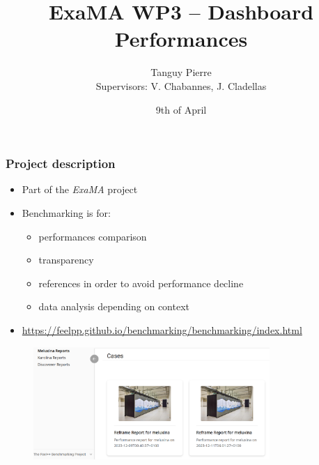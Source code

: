 \documentclass[10pt]{beamer}
\title{\textbf{ExaMA WP3 -- Dashboard Performances}}
\author[Tanguy PIERRE]{Tanguy Pierre\\[1cm] \small{Supervisors: V. Chabannes, J. Cladellas}}
\institute{University of Strasbourg}
\date{9th of April}
\begin{document}
\frame{\titlepage}


\begin{frame}
    \frametitle{\textbf{Project description}}

    \begin{itemize}
        \addtolength{\itemsep}{10pt}
        \item Part of the \textit{ExaMA} project
        \item Benchmarking is for:
        \begin{itemize}
            \item performances comparison
            \item transparency
            \item references in order to avoid performance decline
            \item data analysis depending on context
        \end{itemize}
        \item {\footnotesize\url{https://feelpp.github.io/benchmarking/benchmarking/index.html}}
    \end{itemize}
    \begin{figure}
        \centering
        \includegraphics[width=0.8\textwidth]{../../illustrations/feelpp-dashboard.png}
      \end{figure}
\end{frame}
\end{document}
